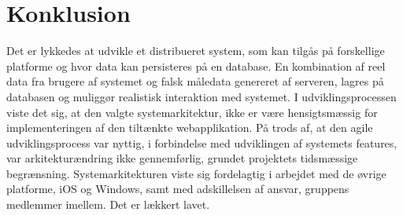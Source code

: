 \chapter{Konklusion}
Det er lykkedes at udvikle et distribueret system, som kan tilgås på forskellige platforme og hvor data kan persisteres på en database. En kombination af reel data fra brugere af systemet og falsk måledata genereret af serveren, lagres på databasen og muliggør realistisk interaktion med systemet. I udviklingsprocessen viste det sig, at den valgte systemarkitektur, ikke er være hensigtsmæssig for implementeringen af den tiltænkte webapplikation. På trods af, at den agile udviklingsprocess var nyttig, i forbindelse med udviklingen af systemets features, var arkitekturændring ikke gennemførlig, grundet projektets tidsmæssige begrænsning. Systemarkitekturen viste sig fordelagtig i arbejdet med de øvrige platforme, iOS og Windows, samt med adskillelsen af ansvar, gruppens medlemmer imellem. Det er lækkert lavet.

%
%
%
%
%
%
